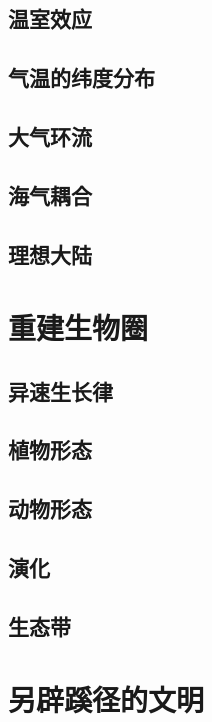 \documentclass[a4paper,10.5pt]{article}
\begin{document}
\subsection{温室效应}

\subsection{气温的纬度分布}

\subsection{大气环流}

\subsection{海气耦合}

\subsection{理想大陆}

\section{重建生物圈}

\subsection{异速生长律}

\subsection{植物形态}

\subsection{动物形态}

\subsection{演化}

\subsection{生态带}

\section{另辟蹊径的文明}
\end{document}
